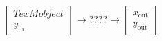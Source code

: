\documentclass[12pt]{beamer}
\begin{document}
\centering

\begin{frame}
    \begin{align*}
        \left[ \begin{array}{c}TexMobject \\ y_\text{in}\end{array} \right] \rightarrow ???? \rightarrow \left[ \begin{array}{c}x_\text{out} \\ y_{\text{out}}\end{array} \right]
    \end{align*}
\end{frame}
\end{document}

